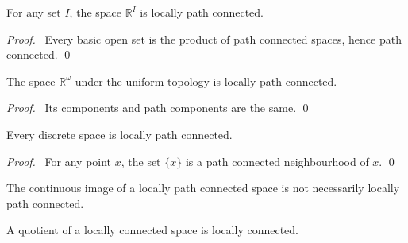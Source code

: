 \begin{prop}
For any set $I$,
 the space $\mathbb{R}^I$ is locally path connected.
\end{prop}

\begin{proof}
\pf\ Every basic open set is the product of path connected spaces, hence path
connected. \qed
\end{proof}

\begin{prop}
 The space $\mathbb{R}^\omega$ under the uniform topology is locally path
connected.
\end{prop}

\begin{proof}
\pf\ Its components and path components are the same. \qed
\end{proof}

\begin{prop}
 Every discrete space is locally path connected.
\end{prop}

\begin{proof}
 \pf\ For any point $x$, the set $\{x\}$ is a path connected neighbourhood of $x$. \qed
\end{proof}

\begin{cor}
 The continuous image of a locally path connected space is not necessarily locally path connected.
\end{cor}

\begin{prop}
  \label{prop:topology:locally_connected:quotient}
A quotient of a locally connected space is locally connected.
\end{prop}

